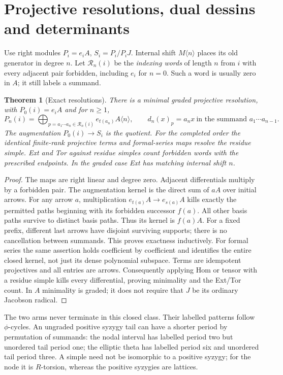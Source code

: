 \documentclass[11pt]{article}
\newtheorem{theorem}{Theorem}[section]
\theoremstyle{definition}\newtheorem{definition}[theorem]{Definition}
\theoremstyle{remark}\newtheorem{remark}[theorem]{Remark}
\newcommand{\gshift}[2]{#1\langle #2\rangle}
\begin{document}
\section{Projective resolutions, dual dessins and determinants}
Use right modules $P_i=e_iA$, $S_i=P_i/P_iJ$. Internal shift $\gshift{M}{n}$ places its old generator in degree $n$. Let $\mathcal R_n(i)$ be the \emph{indexing words} of length $n$ from $i$ with every adjacent pair forbidden, including $e_i$ for $n=0$. Such a word is usually zero in $A$; it still labels a summand.
\begin{theorem}[Exact resolutions]\label{thm:resolution}
There is a minimal graded projective resolution, with $P_0(i)=e_iA$ and for $n\ge1$,
\[
 P_n(i)=\bigoplus_{p=a_1\cdots a_n\in\mathcal R_n(i)}
 \gshift{e_{t(a_n)}A}{n},\qquad
 d_n(x)_p=a_nx\ \text{in the summand }a_1\cdots a_{n-1}.
\]
The augmentation $P_0(i)\to S_i$ is the quotient. For the completed order the identical finite-rank projective terms and formal-series maps resolve the residue simple. Ext and Tor against residue simples count forbidden words with the prescribed endpoints. In the graded case Ext has matching internal shift $n$.
\end{theorem}
\begin{proof}
The maps are right linear and degree zero. Adjacent differentials multiply by a forbidden pair. The augmentation kernel is the direct sum of $aA$ over initial arrows. For any arrow $a$, multiplication $e_{t(a)}A\to e_{s(a)}A$ kills exactly the permitted paths beginning with its forbidden successor $f(a)$. All other basis paths survive to distinct basis paths. Thus its kernel is $f(a)A$. For a fixed prefix, different last arrows have disjoint surviving supports; there is no cancellation between summands. This proves exactness inductively. For formal series the same assertion holds coefficient by coefficient and identifies the entire closed kernel, not just its dense polynomial subspace. Terms are idempotent projectives and all entries are arrows. Consequently applying Hom or tensor with a residue simple kills every differential, proving minimality and the Ext/Tor count. In $A$ minimality is graded; it does not require that $J$ be its ordinary Jacobson radical.
\end{proof}
The two arms never terminate in this closed class. Their labelled patterns follow $\phi$-cycles. An ungraded positive syzygy tail can have a shorter period by permutation of summands: the nodal interval has labelled period two but unordered tail period one; the elliptic theta has labelled period six and unordered tail period three. A simple need not be isomorphic to a positive syzygy; for the node it is $R$-torsion, whereas the positive syzygies are lattices.
\end{document}
